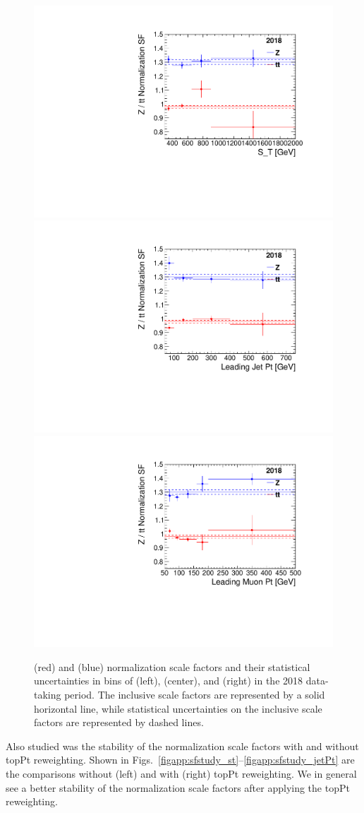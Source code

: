 \begin{figure}[H]
    \centering
    {\includegraphics[width=.4\textwidth]{Images/Analysis/SFStudy/mumuScaleFactors_ST_2018.pdf}}
    {\includegraphics[width=.4\textwidth]{Images/Analysis/SFStudy/mumuScaleFactors_jetPt_2018.pdf}}
    {\includegraphics[width=.4\textwidth]{Images/Analysis/SFStudy/mumuScaleFactors_muPt_2018.pdf}}
    \caption{\ZJETS (red) and \ttbar (blue) normalization scale factors and their statistical uncertainties in bins of \ST (left), \ptof{\PmuOne} (center), and \ptof{\jetOne} (right) in the 2018 data-taking period. The inclusive scale factors are represented by a solid horizontal line, while statistical uncertainties on the inclusive scale factors are represented by dashed lines.}
    \label{figapp:sfstudy_2018}
\end{figure}

Also studied was the stability of the normalization scale factors with and without topPt reweighting. Shown in Figs.~\ref{figapp:sfstudy_st}--\ref{figapp:sfstudy_jetPt} are the comparisons without (left) and with (right) topPt reweighting. We in general see a better stability of the normalization scale factors after applying the topPt reweighting.

